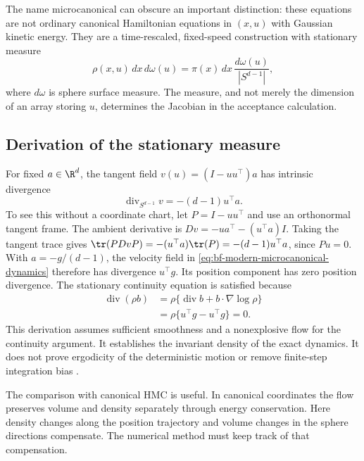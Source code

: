 The name microcanonical can obscure an important distinction: these equations
are not ordinary canonical Hamiltonian equations in $(x,u)$ with Gaussian
kinetic energy. They are a time-rescaled, fixed-speed construction with
stationary measure
\begin{equation}
 \rho(x,u)\,dx\,d\omega(u)
       =\pi(x)\,dx\,\frac{d\omega(u)}{|S^{d-1}|},
 \label{eq:bf-modern-sphere-target}
\end{equation}
where $d\omega$ is sphere surface measure. The measure, and not merely the
dimension of an array storing $u$, determines the Jacobian in the acceptance
calculation.

\subsection{Derivation of the stationary measure}

For fixed $a\in\R^d$, the tangent field
$v(u)=(I-uu^\top)a$ has intrinsic divergence
\begin{equation}
 \operatorname{div}_{S^{d-1}}v=-(d-1)u^\top a.
 \label{eq:bf-modern-sphere-divergence}
\end{equation}
To see this without a coordinate chart, let $P=I-uu^\top$ and use an
orthonormal tangent frame. The ambient derivative is
$Dv=-u a^\top-(u^\top a)I$. Taking the tangent trace gives
$\tr(P Dv P)=-(u^\top a)\tr(P)=-(d-1)u^\top a$, since $Pu=0$.
With $a=-g/(d-1)$, the velocity field in
\eqref{eq:bf-modern-microcanonical-dynamics} therefore has divergence
$u^\top g$. Its position component has zero position divergence. The
stationary continuity equation is satisfied because
\begin{align}
 \operatorname{div}(\rho b)
 &=\rho\{\operatorname{div}b+b\cdot\nabla\log\rho\}\\
 &=\rho\{u^\top g-u^\top g\}=0.
 \label{eq:bf-modern-sphere-stationarity}
\end{align}
This derivation assumes sufficient smoothness and a nonexplosive flow for the
continuity argument. It establishes the invariant density of the exact
dynamics. It does not prove ergodicity of the deterministic motion or remove
finite-step integration bias \citep[Appendix B.4]{robnik2025mams}.

The comparison with canonical HMC is useful. In canonical coordinates the
flow preserves volume and density separately through energy conservation.
Here density changes along the position trajectory and volume changes in the
sphere directions compensate. The numerical method must keep track of that
compensation.

